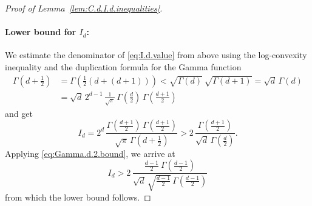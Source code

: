 \documentclass[12pt]{article}
\newcommand{\todo}[1]{{\color{red}{#1}}}
\begin{document}
\begin{appendix}
\begin{proof}[Proof of Lemma~\ref{lem:C.d.I.d.inequalities}]
\paragraph{Lower bound for $I_d$:} 
We estimate the denominator of \eqref{eq:I.d.value} from above using the log-convexity inequality and the duplication formula \cite[5.5.5]{NIST} for the Gamma function 
\begin{equation*}
\begin{split}
\Gamma( d + \tfrac{1}{2} ) 
&= \Gamma(\tfrac{1}{2}( d + ( d + 1 ) ) ) < \sqrt{\Gamma( d ) } \, \sqrt{\Gamma( d + 1 )} = \sqrt{d} \, \Gamma( d ) \\
&= \sqrt{d} \, 2^{d-1} \, \frac{1}{\sqrt{\pi}} \, \Gamma(\tfrac{d}{2}) \, \Gamma(\tfrac{d+1}{2})
\end{split}
\end{equation*}
and get
\begin{equation*}
I_d 
= 
2^d \, \frac{\Gamma( \tfrac{d + 1}{2} ) \, \Gamma( \tfrac{d + 1}{2} )}{\sqrt{\pi} \, \Gamma( d + \tfrac{1}{2} )}
> 2 \, \frac{\Gamma( \tfrac{d + 1}{2})}{\sqrt{d} \, \Gamma( \tfrac{d}{2} )}. 
\end{equation*}
Applying \eqref{eq:Gamma.d.2.bound}, we arrive at
\begin{equation*}
I_d > 2 \, \frac{\tfrac{d - 1}{2} \ \Gamma( \tfrac{d - 1}{2} )}{\sqrt{d} \, \sqrt{\tfrac{d-1}{2}} \, \Gamma( \tfrac{d-1}{2} )}
\end{equation*}
from which the lower bound follows. 


\end{proof}
\end{appendix}
\end{document}
